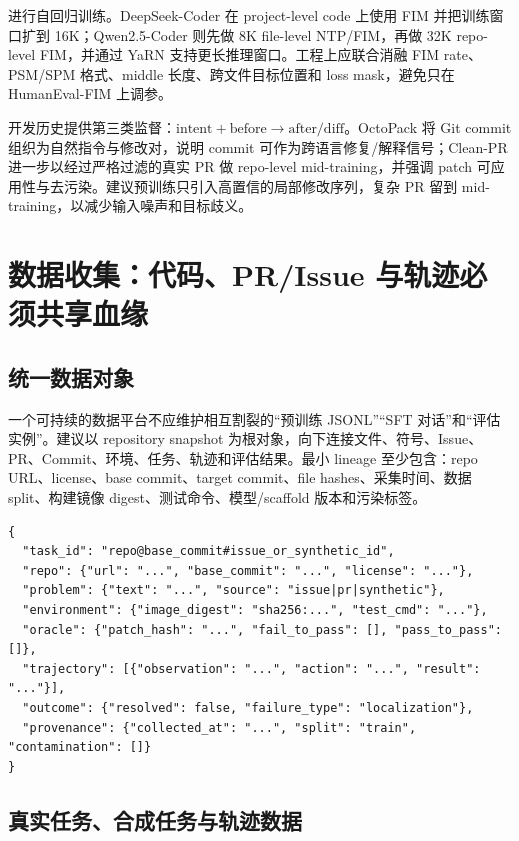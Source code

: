 \documentclass[10pt,a4paper,UTF8,fontset=none]{ctexart}
\newcommand{\ident}[1]{{\rmfamily #1}}
\begin{document}
进行自回归训练。DeepSeek-Coder 在 project-level code 上使用 FIM 并把训练窗口扩到 16K\cite{guo2024deepseekcoder}；Qwen2.5-Coder 则先做 8K file-level NTP/FIM，再做 32K repo-level FIM，并通过 YaRN 支持更长推理窗口\cite{hui2024qwen25coder}。工程上应联合消融 FIM rate、PSM/SPM 格式、middle 长度、跨文件目标位置和 loss mask，避免只在 HumanEval-FIM 上调参。

开发历史提供第三类监督：$\text{intent} + \text{before} \rightarrow \text{after/diff}$。OctoPack 将 Git commit 组织为自然指令与修改对，说明 commit 可作为跨语言修复/解释信号\cite{muennighoff2023octopack}；Clean-PR 进一步以经过严格过滤的真实 PR 做 repo-level mid-training，并强调 patch 可应用性与去污染\cite{lo2026cleanpr}。建议预训练只引入高置信的局部修改序列，复杂 PR 留到 mid-training，以减少输入噪声和目标歧义。

\section{数据收集：代码、PR/Issue 与轨迹必须共享血缘}

\subsection{统一数据对象}

一个可持续的数据平台不应维护相互割裂的“预训练 JSONL”“SFT 对话”和“评估实例”。建议以 \ident{repository snapshot} 为根对象，向下连接文件、符号、Issue、PR、Commit、环境、任务、轨迹和评估结果。最小 lineage 至少包含：repo URL、license、base commit、target commit、file hashes、采集时间、数据 split、构建镜像 digest、测试命令、模型/scaffold 版本和污染标签。

\begin{lstlisting}[style=codeblock,caption={建议的统一任务与轨迹记录（示意）},label={lst:schema}]
{
  "task_id": "repo@base_commit#issue_or_synthetic_id",
  "repo": {"url": "...", "base_commit": "...", "license": "..."},
  "problem": {"text": "...", "source": "issue|pr|synthetic"},
  "environment": {"image_digest": "sha256:...", "test_cmd": "..."},
  "oracle": {"patch_hash": "...", "fail_to_pass": [], "pass_to_pass": []},
  "trajectory": [{"observation": "...", "action": "...", "result": "..."}],
  "outcome": {"resolved": false, "failure_type": "localization"},
  "provenance": {"collected_at": "...", "split": "train", "contamination": []}
}
\end{lstlisting}

\subsection{真实任务、合成任务与轨迹数据}
\end{document}
